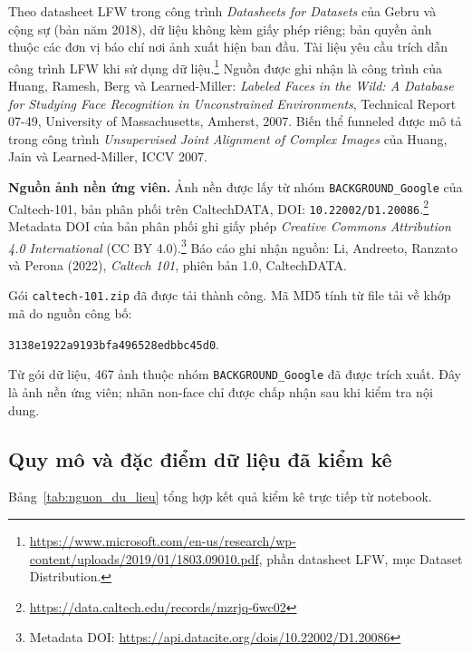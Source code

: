 \documentclass[12pt,a4paper,oneside]{report}
\begin{document}
Theo datasheet LFW trong công trình
\textit{Datasheets for Datasets} của Gebru và cộng sự
(bản năm 2018), dữ liệu không kèm giấy phép riêng;
bản quyền ảnh thuộc các đơn vị báo chí nơi ảnh xuất hiện
ban đầu. Tài liệu yêu cầu trích dẫn công trình LFW khi
sử dụng dữ liệu.\footnote{
\url{https://www.microsoft.com/en-us/research/wp-content/uploads/2019/01/1803.09010.pdf},
phần datasheet LFW, mục Dataset Distribution.
}
Nguồn được ghi nhận là công trình của
Huang, Ramesh, Berg và Learned-Miller:
\textit{Labeled Faces in the Wild: A Database for Studying
Face Recognition in Unconstrained Environments},
Technical Report 07-49, University of Massachusetts,
Amherst, 2007.
Biến thể funneled được mô tả trong công trình
\textit{Unsupervised Joint Alignment of Complex Images}
của Huang, Jain và Learned-Miller, ICCV 2007.

\textbf{Nguồn ảnh nền ứng viên.}
Ảnh nền được lấy từ nhóm \texttt{BACKGROUND\_Google}
của Caltech-101, bản phân phối trên CaltechDATA,
DOI: \texttt{10.22002/D1.20086}.\footnote{
\url{https://data.caltech.edu/records/mzrjq-6wc02}
}
Metadata DOI của bản phân phối ghi giấy phép
\textit{Creative Commons Attribution 4.0 International}
(CC BY 4.0).\footnote{
Metadata DOI:
\url{https://api.datacite.org/dois/10.22002/D1.20086}
}
Báo cáo ghi nhận nguồn:
Li, Andreeto, Ranzato và Perona (2022),
\textit{Caltech 101}, phiên bản 1.0, CaltechDATA.

Gói \texttt{caltech-101.zip} đã được tải thành công.
Mã MD5 tính từ file tải về khớp mã do nguồn công bố:
\begin{center}
\texttt{3138e1922a9193bfa496528edbbc45d0}.
\end{center}
Từ gói dữ liệu, 467 ảnh thuộc nhóm
\texttt{BACKGROUND\_Google} đã được trích xuất.
Đây là ảnh nền ứng viên; nhãn non-face chỉ được
chấp nhận sau khi kiểm tra nội dung.

\subsection*{Quy mô và đặc điểm dữ liệu đã kiểm kê}

Bảng~\ref{tab:nguon_du_lieu} tổng hợp kết quả kiểm kê
trực tiếp từ notebook.
\end{document}
